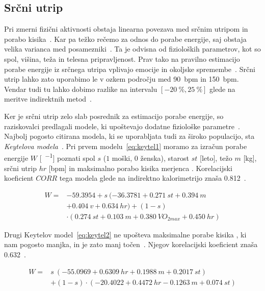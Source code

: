 \subsection{Srčni utrip}\label{sec:srcni-utrip}
Pri zmerni fizični aktivnosti obstaja linearna povezava med srčnim utripom in porabo kisika~\cite{keytel2005prediction}. Kar pa težko rečemo za odnos do porabe energije, saj obstaja velika varianca med posamezniki~\cite{levine2005measurement}. Ta je odvisna od fizioloških parametrov, kot so spol, višina, teža in telesna pripravljenost. Prav tako na pravilno estimacijo porabe energije iz srčnega utripa vplivajo emocije in okoljske spremembe~\cite{keytel2005prediction}. Srčni utrip lahko zato uporabimo le v ozkem področju med \SI{90}{bpm} in \SI{150}{bpm}. Vendar tudi tu lahko dobimo razlike na intervalu $[-20~\% , 25~\%]$ glede na meritve indirektnih metod~\cite{keytel2005prediction}. 

Ker je srčni utrip zelo slab posrednik za estimacijo porabe energije, so raziskovalci predlagali modele, ki upoštevajo dodatne fiziološke parametre~\cite{charlot2014improvement}. Najbolj pogosto citirana modela, ki se uporabljata tudi za široko populacijo, sta \emph{Keytelova modela}~\cite{keytel2005prediction}. Pri prvem modelu~\eqref{eq:keytel1} moramo za izračun porabe energije $W$ [\si{\kcal\per\min}] poznati spol $s$ ($1$ moški, $0$ ženska), starost $st$ [leto], težo $m$ [\si{\kg}], srčni utrip $hr$ [\si{bpm}] in maksimalno porabo kisika merjenca \vomax [\si{\ml\per\kg\per\min}]. Korelacijski koeficient $CORR$ tega modela glede na indirektno kalorimetrijo znaša \num{0.812}~\cite{charlot2014improvement}.

\begin{align} \label{eq:keytel1}
W = & \num{-59.3954} + s~(\num{-36.3781} + \num{0.271}~st + \num{0.394}~m  \nonumber \\
& + \num{0.404}~v + \num{0.634}~hr ) + (1 - s) \nonumber \\
&\cdot (\num{0.274}~st + \num{0.103}~m + \num{0.380}~VO_{2max} + \num{0.450}~hr)
\end{align}

Drugi Keytelov model~\eqref{eq:keytel2} ne upošteva maksimalne porabe kisika \vomax, ki nam pogosto manjka, in je zato manj točen~\cite{keytel2005prediction}. Njegov korelacijski koeficient \corr znaša \num{0.632}~\cite{charlot2014improvement}.

\begin{align}\label{eq:keytel2}
 W = & s~(\num{-55.0969} + \num{0.6309}~hr + \num{0.1988}~m + \num{0.2017}~st) \nonumber \\
 & + (1 - s) \cdot (\num{-20.4022} + \num{0.4472}~hr - \num{0.1263}~m + \num{0.074}~st)
\end{align}

